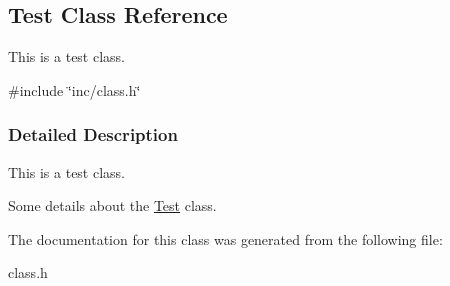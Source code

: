 \hypertarget{class_test}{}\subsection{Test Class Reference}
\label{class_test}


This is a test class.  




{\ttfamily \#include \char`\"{}inc/class.\+h\char`\"{}}



\subsubsection{Detailed Description}
This is a test class. 

Some details about the \hyperlink{class_test}{Test} class. 

The documentation for this class was generated from the following file\+:\begin{DoxyCompactItemize}
\item 
class.\+h\end{DoxyCompactItemize}
